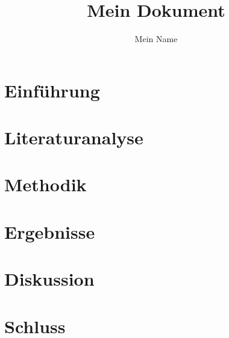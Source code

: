 \documentclass[twocolumn,a4paper]{article}
\title{Mein Dokument}
\author{Mein Name}
\begin{document}
\maketitle

\tableofcontents

\section{Einführung}
\lipsum[1-3]

\section{Literaturanalyse}
\lipsum[4-6]

\section{Methodik}
\lipsum[7-9]

\section{Ergebnisse}
\lipsum[1-3]

\section{Diskussion}
\lipsum[4-6]

\section{Schluss}
\lipsum[7-9]
\end{document}
